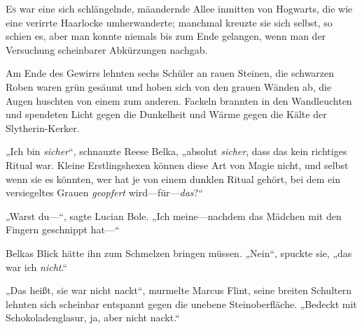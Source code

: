 
\lettrine{E}{s} war eine sich schlängelnde, mäandernde Allee inmitten von Hogwarts, die wie eine verirrte Haarlocke umherwanderte; manchmal kreuzte sie sich selbst, so schien es, aber man konnte niemals bis zum Ende gelangen, wenn man der Versuchung scheinbarer Abkürzungen nachgab.

Am Ende des Gewirrs lehnten sechs Schüler an rauen Steinen, die schwarzen Roben waren grün gesäumt und hoben sich von den grauen Wänden ab, die Augen huschten von einem zum anderen. Fackeln brannten in den Wandleuchten und spendeten Licht gegen die Dunkelheit und Wärme gegen die Kälte der Slytherin-Kerker.

„Ich bin \emph{sicher}“, schnauzte Reese Belka, „absolut \emph{sicher}, dass das kein richtiges Ritual war. Kleine Erstlingshexen können diese Art von Magie nicht, und selbst wenn sie es könnten, wer hat je von einem dunklen Ritual gehört, bei dem ein versiegeltes Grauen \emph{geopfert} wird—für—\emph{das}?“

„Warst du—“, sagte Lucian Bole. „Ich meine—nachdem das Mädchen mit den Fingern geschnippt hat—“

Belkas Blick hätte ihn zum Schmelzen bringen müssen. „Nein“, spuckte sie, „das war ich \emph{nicht}.“

„Das heißt, sie war nicht nackt“, murmelte Marcus Flint, seine breiten Schultern lehnten sich scheinbar entspannt gegen die unebene Steinoberfläche. „Bedeckt mit Schokoladenglasur, ja, aber nicht nackt.“

